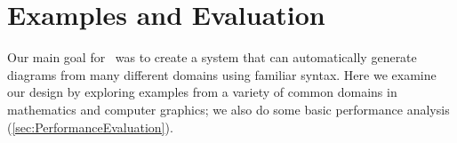 \section{Examples and Evaluation}
\label{sec:ExamplesandEvaluation}





Our main goal for \Penrose\ was to create a system that can automatically generate diagrams from many different domains using familiar syntax. Here we examine our design by exploring examples from a variety of common domains in mathematics and computer graphics; we also do some basic performance analysis (\cref{sec:PerformanceEvaluation}). 




